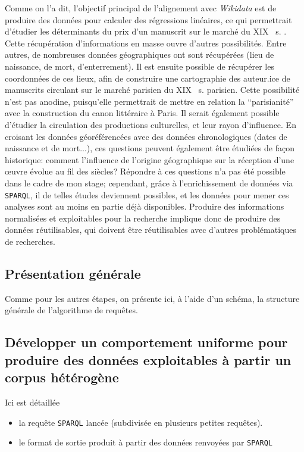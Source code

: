 \documentclass[a4paper, 12pt, twoside]{book}
\newcommand{\scl}[1]{%
	#1%
	\ifthenelse{\equal{#1}{I}}{\up{er}}{\up{ème}}%
	~s.%
}
\newcommand{\sparql}{\texttt{\gls{SPARQL}}}
\newcommand{\wkd}{\textit{Wikidata}}
\begin{document}
Comme on l'a dit, l'objectif principal de l'alignement avec \wkd{} est de produire des données pour calculer des régressions linéaires, ce qui permettrait d'étudier les déterminants du prix d'un manuscrit sur le marché du \scl{XIX}. Cette récupération d'informations en masse ouvre d'autres possibilités. Entre autres, de nombreuses données géographiques ont sont récupérées (lieu de naissance, de mort, d'enterrement). Il est ensuite possible  de récupérer les coordonnées de ces lieux, afin de construire une cartographie des auteur.ice de manuscrits circulant sur le marché parisien du \scl{XIX} parisien. Cette possibilité n'est pas anodine, puisqu'elle permettrait de mettre en relation la \enquote{parisianité} avec la construction du canon littéraire à Paris. Il serait également possible d'étudier la circulation des productions culturelles, et leur rayon d'influence. En croisant les données géoréférencées avec des données chronologiques (dates de naissance et de mort...), ces questions peuvent également être étudiées de façon historique: comment l'influence de l'origine géographique sur la réception d'une œuvre évolue au fil des siècles? Répondre à ces questions n'a pas été possible dans le cadre de mon stage; cependant, grâce à l'enrichissement de données via \sparql{}, il de telles études deviennent possibles, et les données pour mener ces analyses sont au moins en partie déjà disponibles. Produire des informations normalisées et exploitables pour la recherche implique donc de produire des données réutilisables, qui doivent être réutilisables avec d'autres problématiques de recherches.

\subsection{Présentation générale}
Comme pour les autres étapes, on présente ici, à l'aide d'un schéma, la structure générale de l'algorithme de requêtes.

\subsection{Développer un comportement uniforme pour produire des données exploitables à partir un corpus hétérogène}
Ici est détaillée 
\begin{itemize}
	\item la requête \sparql{} lancée (subdivisée en plusieurs petites requêtes).
	\item le format de sortie produit à partir des données renvoyées par \sparql
\end{itemize}
\end{document}
